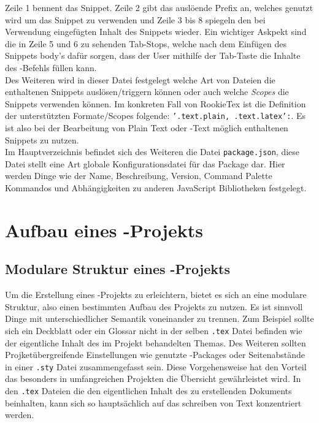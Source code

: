         Zeile 1 bennent das Snippet. Zeile 2 gibt das auslöende Prefix an, welches genutzt wird um das Snippet zu verwenden und Zeile 3 bis 8 spiegeln den bei Verwendung eingefügten Inhalt des Snippets wieder. Ein wichtiger Askpekt sind die in Zeile 5 und 6 zu sehenden Tab-Stops, welche nach dem Einfügen des Snippets body's dafür sorgen, dass der User mithilfe der Tab-Taste die Inhalte des \tex-Befehls füllen kann.
        \\
        Des Weiteren wird in dieser Datei festgelegt welche Art von Dateien die enthaltenen Snippets auslösen/triggern können oder auch welche \textit{Scopes} die Snippets verwenden können. Im konkreten Fall von RookieTex ist die Definition der unterstützten Formate/Scopes folgende: \texttt{'.text.plain, .text.latex':}. Es ist also bei der Bearbeitung von Plain Text oder \latex-Text möglich enthaltenen Snippets zu nutzen.
        \\
        Im Hauptverzeichnis befindet sich des Weiteren die Datei \texttt{package.json}, diese Datei stellt eine Art globale Konfigurationsdatei für das Package dar. Hier werden Dinge wie der Name, Beschreibung, Version, Command Palette Kommandos und Abhängigkeiten zu anderen JavaScript Bibliotheken festgelegt.

\chapter{Aufbau eines \tex-Projekts}
    \section{Modulare Struktur eines \tex-Projekts}
    Um die Erstellung eines \tex-Projekts zu erleichtern, bietet es sich an eine modulare Struktur, also einen bestimmten Aufbau des Projekts zu nutzen. Es ist sinnvoll Dinge mit unterschiedlicher Semantik voneinander zu trennen. Zum Beispiel sollte sich ein Deckblatt oder ein Glossar nicht in der selben \texttt{.tex} Datei befinden wie der eigentliche Inhalt des im Projekt behandelten Themas. Des Weiteren sollten Projketübergreifende Einstellungen wie genutzte \latex-Packages oder Seitenabstände in einer \texttt{.sty} Datei zusammengefasst sein. Diese Vorgehensweise hat den Vorteil das besonders in umfangreichen Projekten die Übersicht gewährleistet wird. In den \texttt{.tex} Dateien die den eigentlichen Inhalt des zu erstellenden Dokuments beinhalten, kann sich so hauptsächlich auf das schreiben von Text konzentriert werden.

